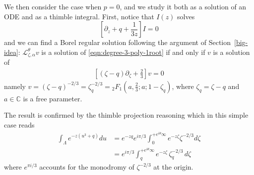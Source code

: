 \documentclass{article}
\theoremstyle{definition}
\newcommand{\C}{\mathbb{C}}
\newcommand{\laplace}{\mathcal{L}}
\begin{document}




We then consider the case when $p=0$, and we study it both as a solution of an ODE and as a thimble integral.
First, notice that $I(z)$ solves
       \begin{equation}\label{eqn:degree-3-poly-1root}
          \left[\partial_z+q+\frac{1}{3z}\right]I=0
       \end{equation}
and we can find a Borel regular solution following the argument of Section~\ref{big-idea}: $\laplace_{\zeta,\alpha}^{\theta}v$ is a solution of \eqref{eqn:degree-3-poly-1root} if and only if $v$ is a solution of 
\begin{align*}
   \left[ (\zeta-q)\partial_\zeta +\frac{2}{3}\right] v=0
\end{align*}
namely $v=(\zeta-q)^{-2/3}=\zeta_q^{-2/3}={}_2F_1\left(a,\frac{2}{3};a;1-\zeta_q\right)$, where $\zeta_q=\zeta-q$ and $a\in\C$ is a free parameter. 

The result is confirmed by the thimble projection reasoning which in this simple case reads
\begin{align*}
    \int_{\Lambda} e^{-z (u^3+q)} du &= e^{-zq} e^{i\pi/3} \int_0^{+e^{i\theta}\infty} e^{-z\zeta} \zeta^{-2/3} d\zeta\\
    &= e^{i\pi/3} \int_q^{+e^{i\theta}\infty} e^{-z\zeta} \, \zeta_q^{-2/3}\,  d\zeta
\end{align*}
where $e^{\pi i/3}$ accounts for the monodromy of $\zeta^{-2/3}$ at the origin. 
\end{document}
